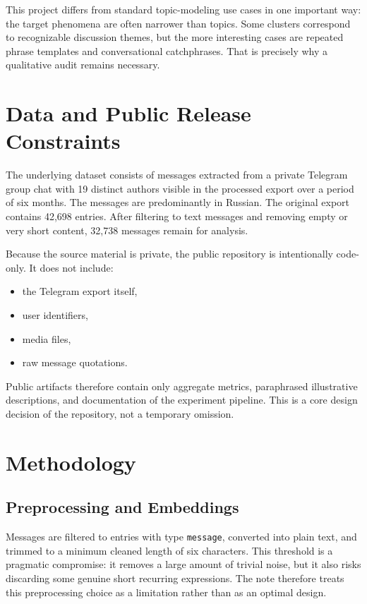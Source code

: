 \documentclass{bmvc2k}
\begin{document}
This project differs from standard topic-modeling use cases in one important way: the target phenomena are often narrower than topics. Some clusters correspond to recognizable discussion themes, but the more interesting cases are repeated phrase templates and conversational catchphrases. That is precisely why a qualitative audit remains necessary.

\section{Data and Public Release Constraints}
\label{sec:data}

The underlying dataset consists of messages extracted from a private Telegram group chat with 19 distinct authors visible in the processed export over a period of six months. The messages are predominantly in Russian. The original export contains 42{,}698 entries. After filtering to text messages and removing empty or very short content, 32{,}738 messages remain for analysis.

Because the source material is private, the public repository is intentionally code-only. It does not include:
\begin{itemize}
    \item the Telegram export itself,
    \item user identifiers,
    \item media files,
    \item raw message quotations.
\end{itemize}

Public artifacts therefore contain only aggregate metrics, paraphrased illustrative descriptions, and documentation of the experiment pipeline. This is a core design decision of the repository, not a temporary omission.

\section{Methodology}

\subsection{Preprocessing and Embeddings}

Messages are filtered to entries with type \texttt{message}, converted into plain text, and trimmed to a minimum cleaned length of six characters. This threshold is a pragmatic compromise: it removes a large amount of trivial noise, but it also risks discarding some genuine short recurring expressions. The note therefore treats this preprocessing choice as a limitation rather than as an optimal design.
\end{document}
